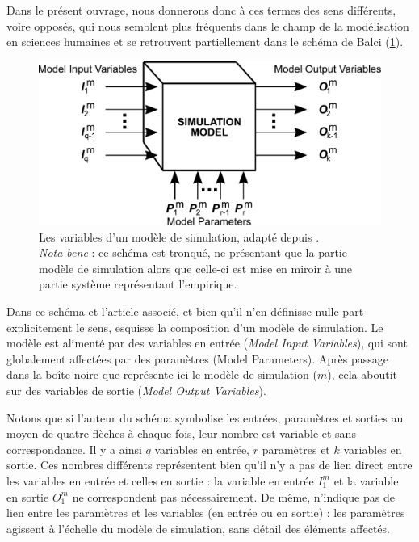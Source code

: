 Dans le présent ouvrage, nous donnerons donc à ces termes des sens différents, voire opposés, qui nous semblent plus fréquents dans le champ de la modélisation en sciences humaines et se retrouvent partiellement dans le schéma de Balci (\cref{fig:parametres-Balci}).

\begin{figure}[!h]
	\centering
	\includegraphics[width=.8\linewidth]{img/schema_parametres_balci.pdf}
	\caption[Les variables d'un modèle de simulation selon \citeauthor{balci_validation_1994}]{Les variables d'un modèle de simulation, adapté depuis \textcite[122]{balci_validation_1994}.\\
		\textit{Nota bene} : ce schéma est tronqué, ne présentant que la partie \og modèle de simulation\fg{} alors que celle-ci est mise en miroir à une partie \og système\fg{} représentant l'empirique.}
	\label{fig:parametres-Balci} 
\end{figure}

Dans ce schéma et l'article associé, et bien qu'il n'en définisse nulle part explicitement le sens, \citeauthor{balci_validation_1994} esquisse la composition d'un modèle de simulation.
Le modèle est alimenté par des variables en entrée (\textit{Model Input Variables}), qui sont globalement affectées par des paramètres (Model Parameters).
Après passage dans la \og boîte noire\fg{} que représente ici le modèle de simulation ($m$), cela aboutit sur des variables de sortie (\textit{Model Output Variables}).

Notons que si l'auteur du schéma symbolise les entrées, paramètres et sorties au moyen de quatre flèches à chaque fois, leur nombre est variable et sans correspondance.
Il y a ainsi $q$ variables en entrée, $r$ paramètres et $k$ variables en sortie.
Ces nombres différents représentent bien qu'il n'y a pas de lien direct entre les variables en entrée et celles en sortie : la variable en entrée $I_{1}^m$ et la variable en sortie $O_{1}^m$ ne correspondent pas nécessairement.
De même, \citeauthor{balci_validation_1994} n'indique pas de lien entre les paramètres et les variables (en entrée ou en sortie) : les paramètres agissent à l'échelle du modèle de simulation, sans détail des éléments affectés.

